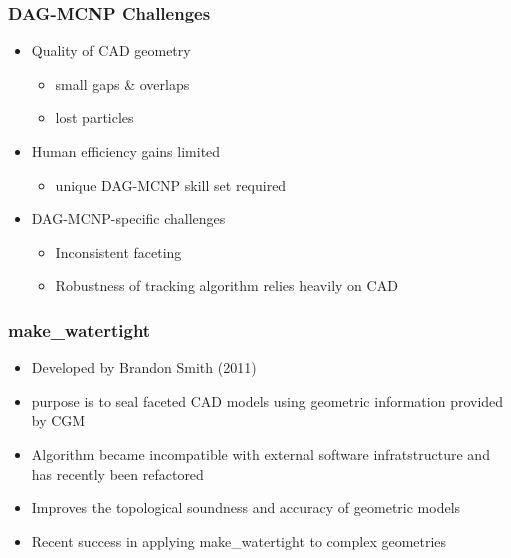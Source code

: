 \documentclass[14pt]{beamer}
\begin{document}
\begin{frame}
\frametitle{DAG-MCNP Challenges}
\begin{itemize}
\vfill

\item Quality of CAD geometry
	\begin{itemize}
	\color{red}
	\item small gaps \& overlaps
	\item lost particles
	\end{itemize}
\vfill
\item Human efficiency gains limited
	\begin{itemize}
	\item unique DAG-MCNP skill set required	
	\end{itemize}
\vfill
\item DAG-MCNP-specific challenges
	\begin{itemize}
	\item Inconsistent faceting
	\item Robustness of tracking algorithm relies heavily on CAD
	\end{itemize}
\end{itemize}
\end{frame}



\begin{frame}
\frametitle{make\_watertight}
\begin{itemize}
\item Developed by Brandon Smith (2011)
\item purpose is to seal faceted CAD models using geometric information provided by CGM
\item Algorithm became incompatible with external software infratstructure and has recently been refactored
\item Improves the topological soundness and accuracy of geometric models
\item Recent success in applying make\_watertight to complex geometries
\end{itemize}
\end{frame}
\end{document}
